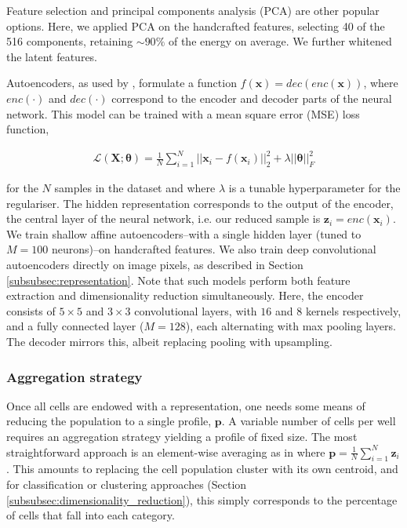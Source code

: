 Feature selection \cite{loo2007image} and principal components analysis (PCA) are other popular options. Here, we applied PCA on the handcrafted features, selecting 40 of the 516 components, retaining $\sim90\%$ of the energy on average. We further whitened the latent features.

Autoencoders, as used by \cite{kandaswamy2016high}, formulate a function $f(\mathbf{x}) = dec(enc(\mathbf{x}))$, where $enc(\cdot)$ and $dec(\cdot)$ correspond to the encoder and decoder parts of the neural network. This model can be trained with a mean square error (MSE) loss function,

\begin{align}
\mathcal{L}(\mathbf{X} ; \boldsymbol\theta) = \frac{1}{N}\sum_{i=1}^N||\mathbf{x}_i - f(\mathbf{x}_i)||_2^2 + \lambda||\mathbf{\boldsymbol\theta}||^2_F
\end{align}

 for the $N$ samples in the dataset and where $\lambda$ is a tunable hyperparameter for the regulariser. The hidden representation corresponds to the output of the encoder, the central layer of the neural network, i.e. our reduced sample is $\mathbf{z}_i = enc(\mathbf{x}_i)$. We train shallow affine autoencoders--with a single hidden layer (tuned to $M = 100$ neurons)--on handcrafted features. We also train deep convolutional autoencoders directly on image pixels, as described in Section \ref{subsubsec:representation}. Note that such models perform both feature extraction and dimensionality reduction simultaneously. Here, the encoder consists of $5 \times 5$ and $3\times 3$ convolutional layers, with $16$ and $8$ kernels respectively, and a fully connected layer ($M = 128$), each alternating with max pooling layers. The decoder mirrors this, albeit replacing pooling with upsampling.

\subsubsection{Aggregation strategy}
\label{subsubsec:aggregation}

Once all cells are endowed with a representation, one needs some means of reducing the population to a single profile, $\mathbf{p}$. A variable number of cells per well requires an aggregation strategy yielding a profile of fixed size. The most straightforward approach is an element-wise averaging as in \cite{adams2006compound} where $\mathbf{p} = \frac{1}{N}\sum_{i=1}^N \mathbf{z}_i$. This amounts to replacing the cell population cluster with its own centroid, and for classification or clustering approaches (Section \ref{subsubsec:dimensionality_reduction}), this simply corresponds to the percentage of cells that fall into each category.


